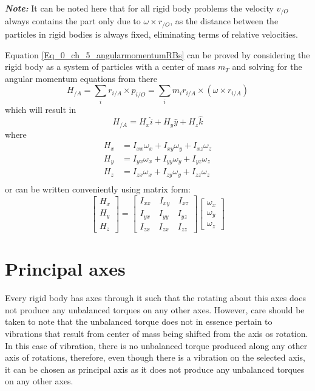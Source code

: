 \textbf{\textit{Note: }}It can be noted here that for all rigid body problems the velocity $v_{/O}$ always contains the part only due to $\omega \times r_{/O}$, as the distance between the particles in rigid bodies is always fixed, eliminating terms of relative velocities.

Equation \eqref{Eq_0_ch_5_angularmomentumRBs} can be proved by considering the rigid body as a system of particles with a center of mass $m_{T}$ and solving for the angular momentum equations from there
\begin{equation}
	H_{/A} = \sum_{i} r_{i/A} \times p_{i/O} = \sum_{i} m_{i} r_{i/A} \times \left( \omega \times r_{i/A} \right)
\end{equation}
which will result in
\begin{equation}
	H_{/A} = H_{x} \hat{i} + H_{y} \hat{y} + H_{z} \hat{k}
\end{equation}
where
\begin{align*}
	H_{x} &= I_{xx}\omega_{x} + I_{xy}\omega_{y} + I_{xz}\omega_{z} \\
	H_{y} &= I_{yx}\omega_{x} + I_{yy}\omega_{y} + I_{yz}\omega_{z} \\
	H_{z} &= I_{zx}\omega_{x} + I_{zy}\omega_{y} + I_{zz}\omega_{z} \\
\end{align*}
or can be written conveniently using matrix form:
\begin{equation} \label{Eq_0_ch_5_angularMomentum_matrixForm}
	\begin{bmatrix}
	H_{x} \\ H_{y} \\ H_{z}	\end{bmatrix} = \begin{bmatrix}
	I_{xx} \quad I_{xy} \quad I_{xz} \\
	I_{yx} \quad I_{yy} \quad I_{yz} \\
	I_{zx} \quad I_{zx} \quad I_{zz}
	\end{bmatrix} \begin{bmatrix}
			\omega_{x} \\ \omega_{y} \\ \omega_{z}
	\end{bmatrix}
\end{equation}

\section{Principal axes}

Every rigid body has axes through it such that the rotating about this axes does not produce any unbalanced torques on any other axes. However, care should be taken to note that the unbalanced torque does not in essence pertain to vibrations that result from center of mass being shifted from the axis os rotation. In this case of vibration, there is no unbalanced torque produced along any other axis of rotations, therefore, even though there is a vibration on the selected axis, it can be chosen as principal axis as it does not produce  any unbalanced torques on any other axes.


